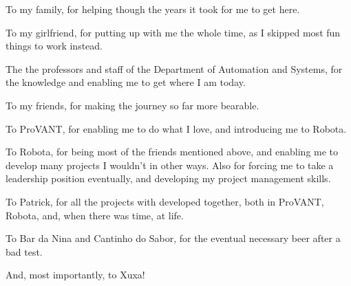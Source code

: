 \begin{agradecimentos}

To my family, for helping though the years it took for me to get here.

To my girlfriend, for putting up with me the whole time, as I skipped most fun things to work instead.

The the professors and staff of the Department of Automation and Systems, for the knowledge and enabling me to get where I am today.

To my friends, for making the journey so far more bearable.

To ProVANT, for enabling me to do what I love, and introducing me to Robota. 

To Robota, for being most of the friends mentioned above, and enabling me to develop many projects I wouldn't in other ways. Also for forcing me to take a leadership position eventually, and developing my project management skills.

To Patrick, for all the projects with developed together, both in ProVANT, Robota, and, when there was time, at life.

To Bar da Nina and Cantinho do Sabor, for the eventual necessary beer after a bad test.

And, most importantly, to Xuxa!


\end{agradecimentos}
